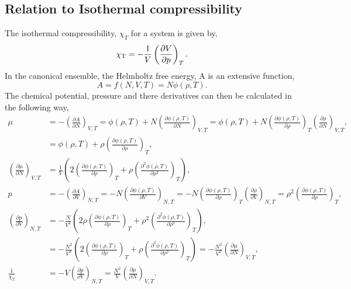 \documentclass[a4paper]{article}
\begin{document}
\subsection{Relation to Isothermal compressibility}
The isothermal compressibility, $\chi_{T}$ for a system is given by,
\begin{equation}
\chi_{\rm T}=-\frac{1}{V}\left(\frac{\partial V}{\partial p}\right)_{T}.
\end{equation}
In the canonical ensemble, the Helmholtz free energy, A is an extensive function,
\begin{equation}
A=f(N,V,T)=N\phi(\rho,T).
\end{equation}
The chemical potential, pressure and there derivatives can then be calculated in the following way,
\begin{equation}
\begin{split}
\mu&=-\left(\frac{\partial A}{\partial N}\right)_{V,T}=\phi(\rho,T)+N\left(\frac{\partial \phi(\rho,T)}{\partial N}\right)_{V,T}=\phi(\rho,T)+N\left(\frac{\partial \phi(\rho,T)}{\partial \rho}\right)_{T}\left(\frac{\partial \rho}{\partial N}\right)_{V,T},\\&=\phi(\rho,T)+\rho\left(\frac{\partial \phi(\rho,T)}{\partial \rho}\right)_{T},\\
\left(\frac{\partial \mu}{\partial N}\right)_{V,T}&=\frac{1}{V}\left(2\left(\frac{\partial \phi(\rho,T)}{\partial \rho}\right)_{T}+\rho\left(\frac{\partial^{2} \phi(\rho,T)}{\partial \rho^{2}}\right)_{T}\right),\\
p&=-\left(\frac{\partial A}{\partial V}\right)_{N,T}=-N\left(\frac{\partial \phi(\rho,T)}{\partial V}\right)_{N,T}=-N\left(\frac{\partial \phi(\rho,T)}{\partial \rho}\right)_{T}\left(\frac{\partial \rho}{\partial V}\right)_{N,T}=\rho^{2}\left(\frac{\partial \phi(\rho,T)}{\partial \rho}\right)_{T},\\
\left(\frac{\partial p}{\partial V}\right)_{N,T}&=-\frac{N}{V^{2}}\left(2\rho\left(\frac{\partial \phi(\rho,T)}{\partial \rho}\right)_{T}+ \rho^{2}\left(\frac{\partial^{2} \phi(\rho,T)}{\partial \rho^{2}}\right)_{T}\right),\\
&=-\frac{N^{2}}{V^{3}}\left(2\left(\frac{\partial \phi(\rho,T)}{\partial \rho}\right)_{T}+ \rho\left(\frac{\partial^{2} \phi(\rho,T)}{\partial \rho^{2}}\right)_{T}\right)=-\frac{N^{2}}{V^{2}}\left(\frac{\partial \mu}{\partial N}\right)_{V,T},\\
\frac{1}{\chi_{T}}&=-V\left(\frac{\partial p}{\partial V}\right)_{N,T}=\frac{N^{2}}{V}\left(\frac{\partial \mu}{\partial N}\right)_{V,T}.
\end{split}
\end{equation}
\end{document}
